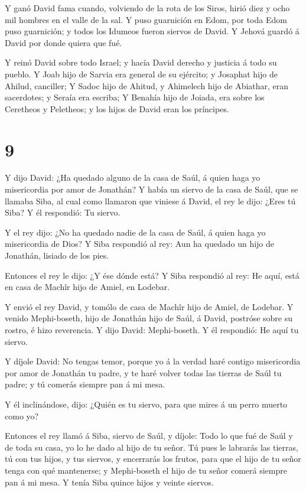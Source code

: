  Y ganó David fama cuando, volviendo de la rota de los
Siros, hirió diez y ocho mil hombres en el valle de la sal.
 Y puso guarnición en Edom, por toda Edom puso guarnición;
y todos los Idumeos fueron siervos de David. Y Jehová guardó á David por
donde quiera que fué.

 Y reinó David sobre todo Israel; y hacía David derecho y
justicia á todo su pueblo.  Y Joab hijo de Sarvia era
general de su ejército; y Josaphat hijo de Ahilud, canciller;
 Y Sadoc hijo de Ahitud, y Ahimelech hijo de Abiathar, eran
sacerdotes; y Seraía era escriba;  Y Benahía hijo de
Joiada, era sobre los Ceretheos y Peletheos; y los hijos de David eran
los príncipes.

\hypertarget{section-8}{%
\section{9}\label{section-8}}

 Y dijo David: ¿Ha quedado alguno de la casa de Saúl, á
quien haga yo misericordia por amor de Jonathán?  Y había un
siervo de la casa de Saúl, que se llamaba Siba, al cual como llamaron
que viniese á David, el rey le dijo: ¿Eres tú Siba? Y él respondió: Tu
siervo.

 Y el rey dijo: ¿No ha quedado nadie de la casa de Saúl, á
quien haga yo misericordia de Dios? Y Siba respondió al rey: Aun ha
quedado un hijo de Jonathán, lisiado de los pies.

 Entonces el rey le dijo: ¿Y ése dónde está? Y Siba
respondió al rey: He aquí, está en casa de Machîr hijo de Amiel, en
Lodebar.

 Y envió el rey David, y tomólo de casa de Machîr hijo de
Amiel, de Lodebar.  Y venido Mephi-boseth, hijo de Jonathán
hijo de Saúl, á David, postróse sobre su rostro, é hizo reverencia. Y
dijo David: Mephi-boseth. Y él respondió: He aquí tu siervo.

 Y díjole David: No tengas temor, porque yo á la verdad haré
contigo misericordia por amor de Jonathán tu padre, y te haré volver
todas las tierras de Saúl tu padre; y tú comerás siempre pan á mi mesa.

 Y él inclinándose, dijo: ¿Quién es tu siervo, para que
mires á un perro muerto como yo?

 Entonces el rey llamó á Siba, siervo de Saúl, y díjole:
Todo lo que fué de Saúl y de toda su casa, yo lo he dado al hijo de tu
señor.  Tú pues le labrarás las tierras, tú con tus hijos,
y tus siervos, y encerrarás los frutos, para que el hijo de tu señor
tenga con qué mantenerse; y Mephi-boseth el hijo de tu señor comerá
siempre pan á mi mesa. Y tenía Siba quince hijos y veinte siervos.

